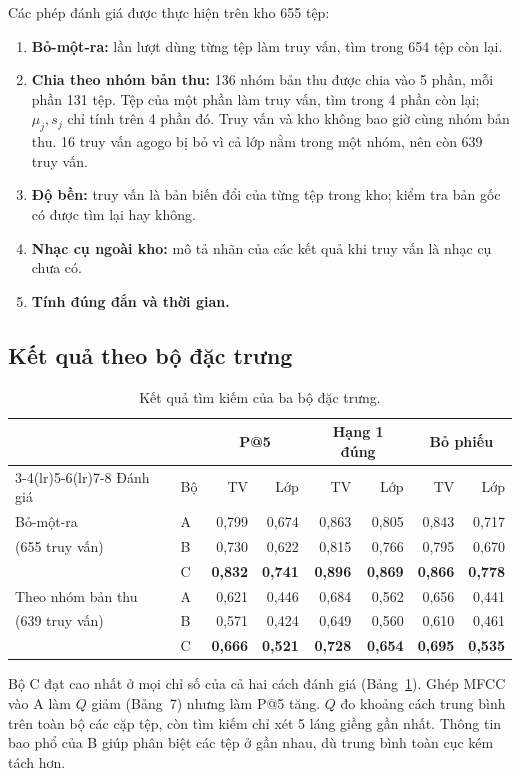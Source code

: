 \documentclass[11pt,a4paper]{article}
\begin{document}
Các phép đánh giá được thực hiện trên kho 655 tệp:
\begin{enumerate}
\item \textbf{Bỏ-một-ra:} lần lượt dùng từng tệp làm truy vấn, tìm trong 654 tệp còn lại.
\item \textbf{Chia theo nhóm bản thu:} 136 nhóm bản thu được chia vào 5 phần, mỗi phần 131 tệp. Tệp của một phần làm truy vấn, tìm trong 4 phần còn lại; $\mu_j, s_j$ chỉ tính trên 4 phần đó. Truy vấn và kho không bao giờ cùng nhóm bản thu. 16 truy vấn agogo bị bỏ vì cả lớp nằm trong một nhóm, nên còn 639 truy vấn.
\item \textbf{Độ bền:} truy vấn là bản biến đổi của từng tệp trong kho; kiểm tra bản gốc có được tìm lại hay không.
\item \textbf{Nhạc cụ ngoài kho:} mô tả nhãn của các kết quả khi truy vấn là nhạc cụ chưa có.
\item \textbf{Tính đúng đắn và thời gian.}
\end{enumerate}

\subsection{Kết quả theo bộ đặc trưng}
\begin{table}[htbp]
\centering\small
\caption{Kết quả tìm kiếm của ba bộ đặc trưng.}\label{tab:ketqua}
\begin{tabular}{llrrrrrr}
\toprule
& & \multicolumn{2}{c}{P@5} & \multicolumn{2}{c}{Hạng 1 đúng} & \multicolumn{2}{c}{Bỏ phiếu}\\
\cmidrule(lr){3-4}\cmidrule(lr){5-6}\cmidrule(lr){7-8}
Đánh giá & Bộ & TV & Lớp & TV & Lớp & TV & Lớp\\\midrule
Bỏ-một-ra & A & 0,799 & 0,674 & 0,863 & 0,805 & 0,843 & 0,717\\
(655 truy vấn) & B & 0,730 & 0,622 & 0,815 & 0,766 & 0,795 & 0,670\\
& C & \textbf{0,832} & \textbf{0,741} & \textbf{0,896} & \textbf{0,869} & \textbf{0,866} & \textbf{0,778}\\\midrule
Theo nhóm bản thu & A & 0,621 & 0,446 & 0,684 & 0,562 & 0,656 & 0,441\\
(639 truy vấn) & B & 0,571 & 0,424 & 0,649 & 0,560 & 0,610 & 0,461\\
& C & \textbf{0,666} & \textbf{0,521} & \textbf{0,728} & \textbf{0,654} & \textbf{0,695} & \textbf{0,535}\\\bottomrule
\end{tabular}
\end{table}
Bộ C đạt cao nhất ở mọi chỉ số của cả hai cách đánh giá (Bảng~\ref{tab:ketqua}). Ghép MFCC vào A làm $Q$ giảm (Bảng~7) nhưng làm P@5 tăng. $Q$ đo khoảng cách trung bình trên toàn bộ các cặp tệp, còn tìm kiếm chỉ xét 5 láng giềng gần nhất. Thông tin bao phổ của B giúp phân biệt các tệp ở gần nhau, dù trung bình toàn cục kém tách hơn.
\end{document}
